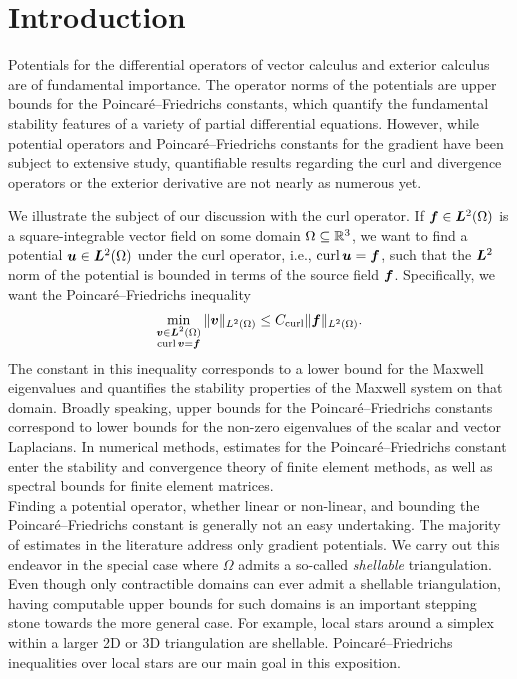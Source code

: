 \documentclass[10pt,a4paper]{article}
\begin{document}
\section{Introduction}\label{section:intro}

Potentials for the differential operators of vector calculus and exterior calculus are of fundamental importance.
The operator norms of the potentials are upper bounds for the Poincar\'e--Friedrichs constants, 
which quantify the fundamental stability features of a variety of partial differential equations.
However, while potential operators and Poincar\'e--Friedrichs constants for the gradient have been subject to extensive study, quantifiable results regarding the curl and divergence operators or the exterior derivative are not nearly as numerous yet. 

We illustrate the subject of our discussion with the curl operator. 
If $\bm{f} \in \bm{L}^{2}(\Omega)$ is a square-integrable vector field on some domain $\Omega \subseteq {\mathbb R}^3$, 
we want to find a potential $\bm{u} \in \bm{L}^2(\Omega)$ under the curl operator, i.e., $\operatorname{curl} \bm{u} = \bm{f}$, such that the $\bm{L}^2$ norm of the potential is bounded in terms of the source field $\bm{f}$. Specifically, we want the Poincar\'e--Friedrichs inequality %
\begin{align*}
    \min\limits_{ \substack{ \bm{v} \in \bm{L}^{2}(\Omega) \\ \operatorname{curl} \bm{v} = \bm{f} } } \| \bm{v} \|_{L^{2}(\Omega)}
    \leq 
    C_{\operatorname{curl}}
    \| \bm{f} \|_{L^{2}(\Omega)}
    .
\end{align*}
The constant in this inequality corresponds to a lower bound for the Maxwell eigenvalues and quantifies the stability properties of the Maxwell system on that domain. 
Broadly speaking, upper bounds for the Poincar\'e--Friedrichs constants correspond to lower bounds for the non-zero eigenvalues of the scalar and vector Laplacians.
In numerical methods, estimates for the Poincar\'e--Friedrichs constant enter the stability and convergence theory of finite element methods, as well as spectral bounds for finite element matrices. 
\\



Finding a potential operator, whether linear or non-linear, and bounding the Poincar\'e--Friedrichs constant is generally not an easy undertaking. 
The majority of estimates in the literature address only gradient potentials. 
We carry out this endeavor in the special case where $\Omega$ admits a so-called \emph{shellable} triangulation. 
Even though only contractible domains can ever admit a shellable triangulation, 
having computable upper bounds for such domains is an important stepping stone towards the more general case. 
For example, local stars around a simplex within a larger 2D or 3D triangulation are shellable.
Poincar\'e--Friedrichs inequalities over local stars are our main goal in this exposition. 
\\
\end{document}
